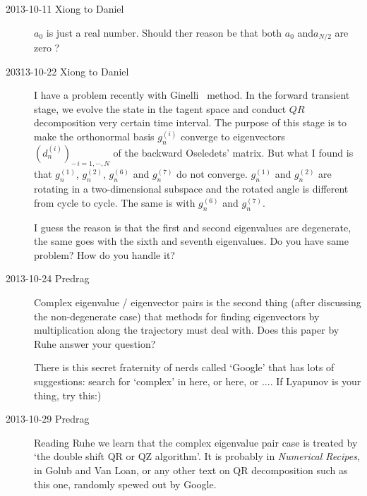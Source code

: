 \begin{description}
\item[2013-10-11 Xiong to Daniel]
$a_{0}$ is just a real number.  Should ther reason be that both $a_{0}$ and$a_{N/2}$ are zero ?

\item[20313-10-22 Xiong to Daniel]
I have a problem recently with Ginelli \etal\ method.  In the forward transient stage, we evolve the state in the tagent space and
conduct $QR$ decomposition very certain time interval. The purpose of this stage is to make the orthonormal basis $g_{n}^{(i)}$
converge to eigenvectors ${(d_{n}^{(i)})_{-}}_{i=1,\cdots,N}$ of the backward Oseledets' matrix. But what I found is that
$g_{n}^{(1)}$, $g_{n}^{(2)}$, $g_{n}^{(6)}$ and $g_{n}^{(7)}$ do not converge. $g_{n}^{(1)}$ and $g_{n}^{(2)}$ are rotating
in a two-dimensional subspace and the rotated angle is different from cycle to cycle. The same is with $g_{n}^{(6)}$ and
$g_{n}^{(7)}$.

I guess the reason is that the first and second eigenvalues are degenerate, the same goes with the sixth and seventh
eigenvalues. Do you have same problem? How do you handle it?

\item[2013-10-24 Predrag] Complex eigenvalue / eigenvector pairs
is the second thing (after discussing the non-degenerate
case) that methods for
finding eigenvectors by multiplication along the trajectory
must deal with. Does this paper by
{Ruhe} answer your question?

There is this secret fraternity of
nerds called `Google' that has lots of suggestions: search for `complex' in
{here}, or
 {here}, or ....
If Lyapunov is your thing,
 {try this:)}

\item[2013-10-29 Predrag] Reading {Ruhe} we learn that
the complex eigenvalue pair case is treated by `the double shift
QR or QZ algorithm'. It is probably in {\em  Numerical Recipes},
in Golub and Van Loan, or any other text on QR decomposition such as 
{this one}, randomly spewed out by Google.


\end{description}
